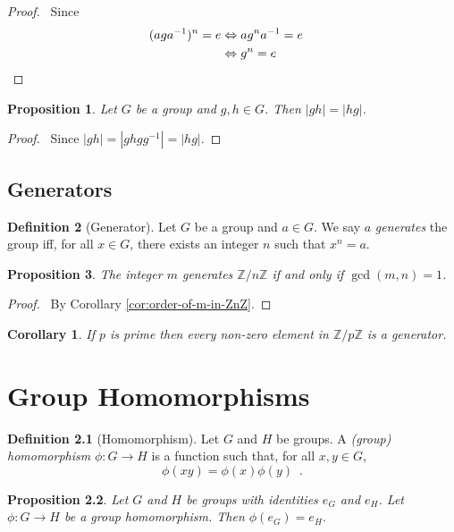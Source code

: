 \documentclass{book}
\let\qed\relax
\newtheorem{prop}{Proposition}[chapter]
\newtheorem{cor}{Corollary}[prop]
\theoremstyle{definition}
\newtheorem{df}[prop]{Definition}
\newcommand{\inv}[1]{\ensuremath{{#1}^{-1}}}
\begin{document}
\begin{proof}
    \pf\ Since
    \begin{align*}
        (ag\inv{a})^n = e & \Leftrightarrow a g^n \inv{a} = e \\
        & \Leftrightarrow g^n = e & \qed
    \end{align*}
\end{proof}

\begin{prop}
    Let $G$ be a group and $g,h \in G$. Then $|gh| = |hg|$.
\end{prop}

\begin{proof}
    \pf\ Since $|gh| = |ghg\inv{g}| = |hg|$. \qed
\end{proof}

\section{Generators}

\begin{df}[Generator]
    Let $G$ be a group and $a \in G$. We say $a$ \emph{generates} the group iff, for all $x \in G$, there exists an integer $n$ such that $x^n = a$.
\end{df}

\begin{prop}
    The integer $m$ generates $\mathbb{Z} / n \mathbb{Z}$ if and only if $\gcd(m,n) = 1$.
\end{prop}

\begin{proof}
    \pf\ By Corollary \ref{cor:order-of-m-in-ZnZ}. \qed
\end{proof}

\begin{cor}
    If $p$ is prime then every non-zero element in $\mathbb{Z} / p \mathbb{Z}$ is a generator.
\end{cor}

\chapter{Group Homomorphisms}

\begin{df}[Homomorphism]
    Let $G$ and $H$ be groups. A \emph{(group) homomorphism} $\phi : G \rightarrow H$ is a function such that, for all $x,y \in G$,
    \[ \phi(xy) = \phi(x) \phi(y) \enspace . \]
\end{df}

\begin{prop}
    Let $G$ and $H$ be groups with identities $e_G$ and $e_H$.
    Let $\phi : G \rightarrow H$ be a group homomorphism. Then $\phi(e_G) = e_H$.
\end{prop}
\end{document}
